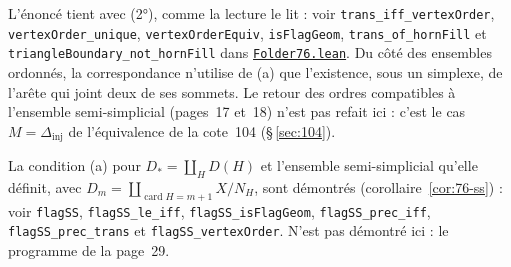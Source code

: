 {\sloppy \noindent L'énoncé tient avec (2°), comme la lecture le lit : voir \texttt{trans\_iff\_vertexOrder}, \texttt{vertexOrder\_unique}, \texttt{vertexOrderEquiv}, \texttt{isFlagGeom}, \texttt{trans\_of\_hornFill} et \texttt{triangleBoundary\_not\_hornFill} dans \href{\leanblob/Combinatorics/Folder76.lean}{\texttt{Folder76.\allowbreak{}lean}}. Du côté des ensembles ordonnés, la correspondance n'utilise de (a) que l'existence, sous un simplexe, de l'arête qui joint deux de ses sommets. Le retour des ordres compatibles à l'ensemble semi-simplicial (pages~17 et~18) n'est pas refait ici : c'est le cas $M = \Delta_{\mathrm{inj}}$ de l'équivalence de la cote~104 (§\,\ref{sec:104}).\par}

La condition (a) pour $D_* = \coprod_H D(H)$ et l'ensemble semi-simplicial qu'elle définit, avec $D_m = \coprod_{\operatorname{card} H = m+1} X/N_H$, sont démontrés (corollaire~\ref{cor:76-ss}) : voir \texttt{flagSS}, \texttt{flagSS\_le\_iff}, \texttt{flagSS\_isFlagGeom}, \texttt{flagSS\_prec\_iff}, \texttt{flagSS\_prec\_trans} et \texttt{flagSS\_vertexOrder}. N'est pas démontré ici : le programme de la page~29.
